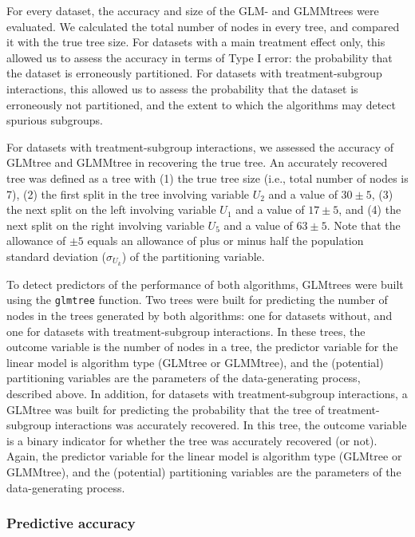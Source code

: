\documentclass[nobf,doc]{apa}
\begin{document}
For every dataset, the accuracy and size of the GLM- and GLMMtrees were evaluated. We calculated the total number of nodes in every tree, and compared it with the true tree size. For datasets with a main treatment effect only, this allowed us to assess the accuracy in terms of Type I error: the probability that the dataset is erroneously partitioned. For datasets with treatment-subgroup interactions, this allowed us to assess the probability that the dataset is erroneously not partitioned, and the extent to which the algorithms may detect spurious subgroups.

For datasets with treatment-subgroup interactions, we assessed the accuracy of GLMtree and GLMMtree in recovering the true tree. An accurately recovered tree was defined as a tree with (1) the true tree size (i.e., total number of nodes is 7), (2) the first split in the tree involving variable $U_2$ and a value of $30 \pm 5$, (3) the next split on the left involving variable $U_1$ and a value of $17 \pm 5$, and (4) the next split on the right involving variable $U_5$ and a value of $63 \pm 5$. Note that the allowance of $\pm 5$ equals an allowance of plus or minus half the population standard deviation ($\sigma_{U_k}$) of the partitioning variable. 

To detect predictors of the performance of both algorithms, GLMtrees were built using the \verb|glmtree| function. Two trees were built for predicting the number of nodes in the trees generated by both algorithms: one for datasets without, and one for datasets with treatment-subgroup interactions. In these trees, the outcome variable is the number of nodes in a tree, the predictor variable for the linear model is algorithm type (GLMtree or GLMMtree), and the (potential) partitioning variables are the parameters of the data-generating process, described above. In addition, for datasets with treatment-subgroup interactions, a GLMtree was built for predicting the probability that the tree of treatment-subgroup interactions was accurately recovered. In this tree, the outcome variable is a binary indicator for whether the tree was accurately recovered (or not). Again, the predictor variable for the linear model is algorithm type (GLMtree or GLMMtree), and the (potential) partitioning variables are the parameters of the data-generating process.

\subsubsection{Predictive accuracy} 
\end{document}
